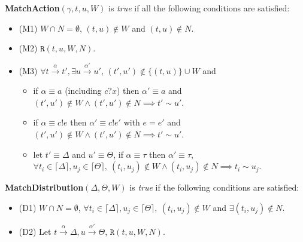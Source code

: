 \documentclass[a4paper,UKenglish,cleveref, autoref]{lipics-v2019}
\begin{document}
\begin{definition}\label{def:matchaction}
\textbf{MatchAction}$(\gamma,t,u,W)$ is \textit{true} if all the following conditions are satisfied:
\begin{itemize}
    \item(M1) $W\cap N=\emptyset$, $(t,u)\notin W$ and $(t,u)\notin N$.
    \item(M2) $\texttt{R}(t,u,W,N)$.
    \item(M3) $\forall t\xrightarrow{\alpha}t', \exists u\xrightarrow{\alpha'}u'$, $(t',u')\notin \{(t,u)\}\cup W$ and 
    \begin{itemize}
        \item if $\alpha\equiv a$ (including $c?x$) then $\alpha'\equiv a$ and $(t',u')\notin W\wedge(t',u')\notin N\implies t'\sim u'$.
        \item if $\alpha\equiv c!e$ then $\alpha'\equiv c!e'$ with $e=e'$ and $(t',u')\notin W\wedge(t',u')\notin N\implies t'\sim u'$.
        \item let $t'\equiv \Delta$ and $u'\equiv \Theta$, if $\alpha\equiv \tau$ then $\alpha'\equiv \tau$, $\forall t_i\in \lceil\Delta\rceil, u_j\in \lceil\Theta\rceil,\ (t_i,u_j)\notin W\wedge(t_i,u_j)\notin N\implies t_i\sim u_j$.
    \end{itemize}
\end{itemize}
\end{definition}

\begin{definition}\label{def:matchdistribution}
\textbf{MatchDistribution}$(\Delta,\Theta,W)$ is \textit{true} if the following conditions are satisfied:
\begin{itemize}
    \item(D1) $W\cap N=\emptyset$, $\forall t_i\in \lceil\Delta\rceil, u_j\in \lceil\Theta\rceil,\ (t_i,u_j)\notin W$ and $\exists (t_i,u_j)\notin N$.
    \item(D2) Let $t\xrightarrow{\alpha}\Delta, u\xrightarrow{\alpha'}\Theta$, $\texttt{R}(t,u,W,N)$.
\end{itemize}
\end{definition}
\end{document}
